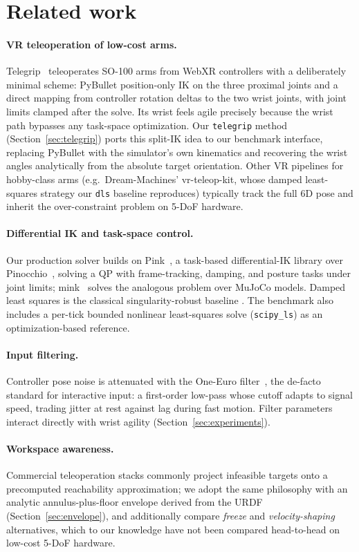 \section{Related work}
\label{sec:related}

\paragraph{VR teleoperation of low-cost arms.}
Telegrip~\citep{telegrip} teleoperates SO-100 arms from WebXR controllers
with a deliberately minimal scheme: PyBullet position-only IK on the three
proximal joints and a direct mapping from controller rotation deltas to the
two wrist joints, with joint limits clamped after the solve. Its wrist
feels agile precisely because the wrist path bypasses any task-space
optimization. Our \texttt{telegrip} method (Section~\ref{sec:telegrip})
ports this split-IK idea to our benchmark interface, replacing PyBullet
with the simulator's own kinematics and recovering the wrist angles
analytically from the absolute target orientation. Other VR pipelines for
hobby-class arms (e.g.\ Dream-Machines' vr-teleop-kit, whose damped
least-squares strategy our \texttt{dls} baseline reproduces) typically
track the full 6D pose and inherit the over-constraint problem on 5-DoF
hardware.

\paragraph{Differential IK and task-space control.}
Our production solver builds on Pink~\citep{pink}, a task-based
differential-IK library over Pinocchio~\citep{pinocchio}, solving a QP with
frame-tracking, damping, and posture tasks under joint limits;
mink~\citep{mink} solves the analogous problem over MuJoCo models. Damped
least squares is the classical singularity-robust baseline
\citep{wampler1986,nakamura1986}. The benchmark also includes a per-tick
bounded nonlinear least-squares solve (\texttt{scipy\_ls}) as an
optimization-based reference.

\paragraph{Input filtering.}
Controller pose noise is attenuated with the One-Euro
filter~\citep{oneeuro}, the de-facto standard for interactive input: a
first-order low-pass whose cutoff adapts to signal speed, trading jitter at
rest against lag during fast motion. Filter parameters interact directly
with wrist agility (Section~\ref{sec:experiments}).

\paragraph{Workspace awareness.}
Commercial teleoperation stacks commonly project infeasible targets onto a
precomputed reachability approximation; we adopt the same philosophy with
an analytic annulus-plus-floor envelope derived from the URDF
(Section~\ref{sec:envelope}), and additionally compare \emph{freeze} and
\emph{velocity-shaping} alternatives, which to our knowledge have not been
compared head-to-head on low-cost 5-DoF hardware.
